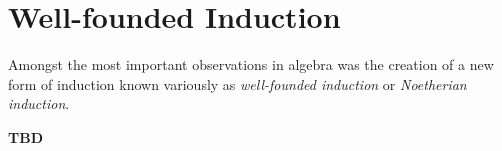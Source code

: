 \section{Well-founded Induction}
Amongst the most important observations in algebra was the creation 
of a new form of induction known variously as \emph{well-founded induction}
or \emph{Noetherian induction}.

\textbf{TBD}